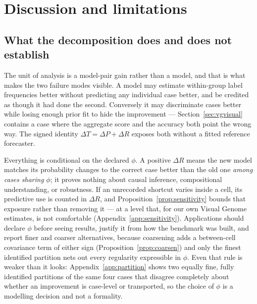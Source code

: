 \section{Discussion and limitations}\label{sec:discussion}

\subsection{What the decomposition does and does not establish}

The unit of analysis is a model-pair gain rather than a model, and that is what makes the
two failure modes visible. A model may estimate within-group label frequencies better
without predicting any individual case better, and be credited as though it had done the
second. Conversely it may discriminate cases better while losing enough prior fit to hide
the improvement --- Section~\ref{sec:vgvisual} contains a case where the aggregate score
and the accuracy both point the wrong way. The signed identity $\Delta T=\Delta P+\Delta R$
exposes both without a fitted reference forecaster.

Everything is conditional on the declared $\phi$. A positive $\Delta R$ means the new model
matches its probability changes to the correct case better than the old one \emph{among
cases sharing $\phi$}; it proves nothing about causal inference, compositional
understanding, or robustness. If an unrecorded shortcut varies inside a cell, its predictive
use is counted in $\Delta R$, and Proposition~\ref{prop:sensitivity} bounds that exposure
rather than removing it --- at a level that, for our own Visual Genome estimates, is not
comfortable (Appendix~\ref{app:sensitivity}). Applications should declare $\phi$ before
seeing results, justify it from how the benchmark was built, and report finer and coarser
alternatives, because coarsening adds a between-cell covariance term of either sign
(Proposition~\ref{prop:coarsen}) and only the finest identified partition nets out every
regularity expressible in $\phi$. Even that rule is weaker than it looks:
Appendix~\ref{app:partition} shows two equally fine, fully identified partitions of the same
four cases that disagree completely about whether an improvement is case-level or
transported, so the choice of $\phi$ is a modelling decision and not a formality.

